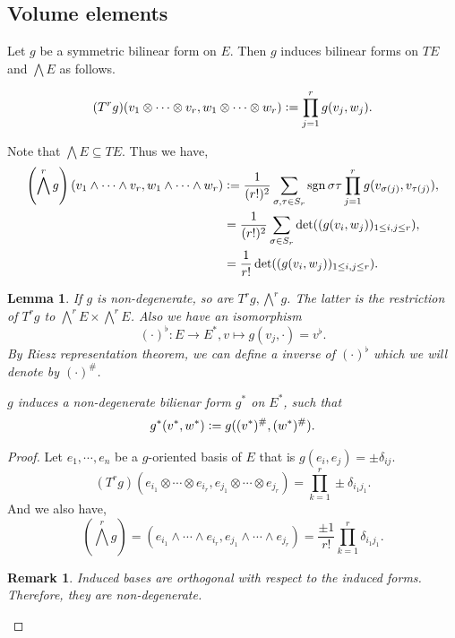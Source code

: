 \documentclass[10pt]{article}
\newtheorem{lemma}{Lemma}[section]
\newtheorem{remark}{Remark}[section]
\DeclareMathOperator{\sgn}{sgn}
\newcommand{\defeq}{\vcentcolon=}
\begin{document}
\subsection{Volume elements}
Let $g$ be a symmetric bilinear form on $E$. Then $g$ induces bilinear forms on $TE$ and $\bigwedge E$ as follows. 

\begin{equation*}
  (T^rg)(v_1\otimes\cdots\otimes v_r,w_1\otimes\cdots\otimes w_r) \defeq \prod_{j=1}^rg(v_j,w_j).
\end{equation*}

Note that $\bigwedge E\subseteq TE$. Thus we have,
\begin{align*}
  \left(\bigwedge^rg\right)(v_1\wedge\cdots\wedge v_r, w_1\wedge\cdots\wedge w_r) &\defeq {\frac 1 {(r!)^2}}\sum_{\sigma,\tau\in S_r}\sgn\sigma\tau\prod_{j=1}^rg(v_{\sigma(j)},v_{\tau(j)}),\\
  & = {\frac 1 {(r!)^2}}\sum_{\sigma\in S_r}\det((g(v_i,w_j))_{1\leq i,j\leq r}),\\
  & = {\frac 1 {r!}}\det((g(v_i,w_j))_{1\leq i,j\leq r}).
\end{align*}

\begin{lemma}
  \label{lemma_11_5}
  If $g$ is non-degenerate, so are $T^rg,\bigwedge^rg$. The latter is the restriction of $T^r g$ to $\bigwedge^r E\times\bigwedge^r E$. Also we have an isomorphism 
  \begin{equation*}
    (\cdot)^\flat:E\to E^*,v\mapsto g(v_j,\cdot) = v^\flat.
  \end{equation*}
   By Riesz representation theorem, we can define a inverse of $(\cdot)^\flat$ which we will denote by $(\cdot)^\#$. 
  \par $g$ induces a non-degenerate bilienar form $g^\ast$ on $E^*$, such that 
  \begin{equation*}
    g^*(v^*,w^*)\defeq g((v^*)^\#, (w^*)^\#).
  \end{equation*}
\end{lemma}

\begin{proof}
  Let $e_1,\cdots,e_n$ be a $g$-oriented basis of $E$ that is $g(e_i,e_j) = \pm\delta_{ij}$. 
  \begin{equation*}
    (T^rg)(e_{i_1}\otimes\cdots\otimes e_{i_r},e_{j_1}\otimes\cdots\otimes e_{j_r}) = \prod_{k=1}^r \pm\delta_{i_1j_1}.
  \end{equation*}
  And we also have,
  \begin{equation*}
    \left(\bigwedge^r g\right) = (e_{i_1}\wedge\cdots\wedge e_{i_r},e_{j_1}\wedge\cdots\wedge e_{j_r}) = {\frac {\pm1} {r!}}\prod_{k=1}^r \delta_{i_1j_1}.
  \end{equation*}
  \begin{remark}
    Induced bases are orthogonal with respect to the induced forms. Therefore, they are non-degenerate.
  \end{remark}
\end{proof}
\end{document}
